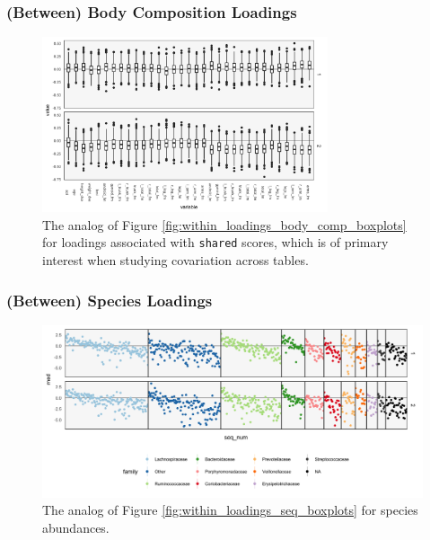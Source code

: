 \documentclass{beamer}
\begin{document}
\begin{frame}
  \frametitle{(Between) Body Composition Loadings}
\begin{figure}[ht]
  \centering
  \includegraphics[width=0.75\textwidth]{figure/between_loadings_body_comp_boxplots}
  \caption{The analog of Figure \ref{fig:within_loadings_body_comp_boxplots} for
    loadings associated with \texttt{shared} scores, which is of primary
    interest when studying covariation across
    tables. \label{fig:shared_loadings_body_comp_boxplots} }
\end{figure}
\end{frame}

\begin{frame}
  \frametitle{(Between) Species Loadings}
  \begin{figure}[ht]
    \centering
    \includegraphics[width=\textwidth]{figure/between_loadings_seq_boxplots}
    \caption{The analog of Figure \ref{fig:within_loadings_seq_boxplots} for
      species abundances. \label{fig:shared_loadings_seq_boxplots} }
  \end{figure}
\end{frame}
\end{document}
